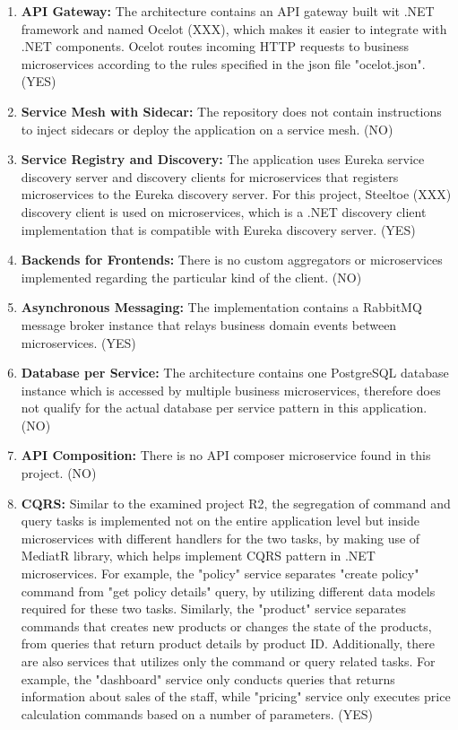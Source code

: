 \documentclass{Configuration_Files/PoliMi3i_thesis}
\begin{document}
\begin{enumerate}
    \item \textbf{API Gateway:} The architecture contains an API gateway built wit .NET framework and named Ocelot (XXX), which makes it easier to integrate with .NET components.
    Ocelot routes incoming HTTP requests to business microservices according to the rules specified in the json file "ocelot.json". (YES)
    
    \item \textbf{Service Mesh with Sidecar:} The repository does not contain instructions to inject sidecars or deploy the application on a service mesh. (NO)
    
    \item \textbf{Service Registry and Discovery:} The application uses Eureka service discovery server and discovery clients for microservices that registers microservices to the Eureka discovery server.
    For this project, Steeltoe (XXX) discovery client is used on microservices, which is a .NET discovery client implementation that is compatible with Eureka discovery server. (YES)
    
    \item \textbf{Backends for Frontends:} There is no custom aggregators or microservices implemented regarding the particular kind of the client. (NO)
    
    \item \textbf{Asynchronous Messaging:} The implementation contains a RabbitMQ message broker instance that relays business domain events between microservices. (YES)
    
    \item \textbf{Database per Service:} The architecture contains one PostgreSQL database instance which is accessed by multiple business microservices, therefore does not qualify for the actual database per service pattern in this application. (NO)
    
    \item \textbf{API Composition:} There is no API composer microservice found in this project. (NO)
    
    \item \textbf{CQRS:} Similar to the examined project R2, the segregation of command and query tasks is implemented not on the entire application level but inside microservices with different handlers for the two tasks, by making use of MediatR library, which helps implement CQRS pattern in .NET microservices.
    For example, the "policy" service separates "create policy" command from "get policy details" query, by utilizing different data models required for these two tasks.
    Similarly, the "product" service separates commands that creates new products or changes the state of the products, from queries that return product details by product ID.
    Additionally, there are also services that utilizes only the command or query related tasks.
    For example, the "dashboard" service only conducts queries that returns information about sales of the staff, while "pricing" service only executes price calculation commands based on a number of parameters. (YES)
    

\end{enumerate}
\end{document}
